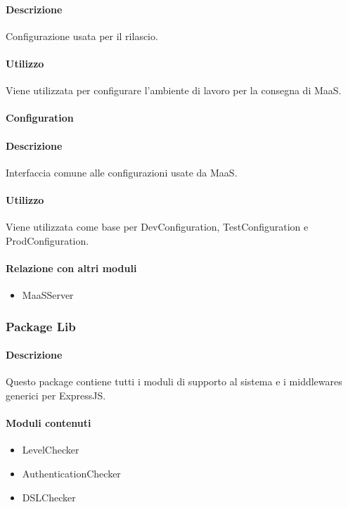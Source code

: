 \paragraph*{Descrizione}
Configurazione usata per il rilascio.

\paragraph*{Utilizzo}
Viene utilizzata per configurare l'ambiente di lavoro per la consegna di MaaS.

\paragraph{Configuration}
\paragraph*{Descrizione}
Interfaccia comune alle configurazioni usate da MaaS.

\paragraph*{Utilizzo}
Viene utilizzata come base per DevConfiguration, TestConfiguration e ProdConfiguration.

\paragraph*{Relazione con altri moduli}
\begin{itemize}
\item MaaSServer
\end{itemize}

\subsubsection{Package Lib}
\paragraph*{Descrizione}
Questo package contiene tutti i moduli di supporto al sistema e i middlewares generici per ExpressJS.

\paragraph*{Moduli contenuti}
\begin{itemize}
\item LevelChecker
\item AuthenticationChecker
\item DSLChecker
\end{itemize}

